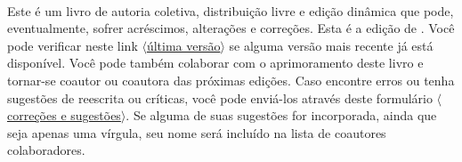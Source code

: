 \thispagestyle{empty}
\onecolumn
\ 
\vfill

\parbox{3 in}{

Este é um livro de autoria coletiva, distribuição livre e edição dinâmica que pode, eventualmente, sofrer acréscimos, alterações e correções.
Esta é a edição de \mydate.
Você pode verificar neste link
\href{https://github.com/Grupo-de-Estudos-em-Logica-da-UFRN/Para-Todxs-Natal/blob/main/paratodxsnatal.pdf}{$\langle$última versão$\rangle$}
se alguma versão mais recente já está disponível.
Você pode também colaborar com o aprimoramento deste livro e tornar-se coautor ou coautora das próximas edições.
Caso encontre erros ou tenha sugestões de reescrita ou críticas, você pode enviá-los através deste formulário 
\href{https://forms.gle/yd4yH9WAo6TxAiSj8}{$\langle$correções e sugestões$\rangle$}.
Se alguma de suas sugestões for incorporada, ainda que seja apenas uma vírgula, seu nome será incluído na lista de coautores colaboradores. 

}

\vfill

\parbox{3 in}{

}
\vfill
